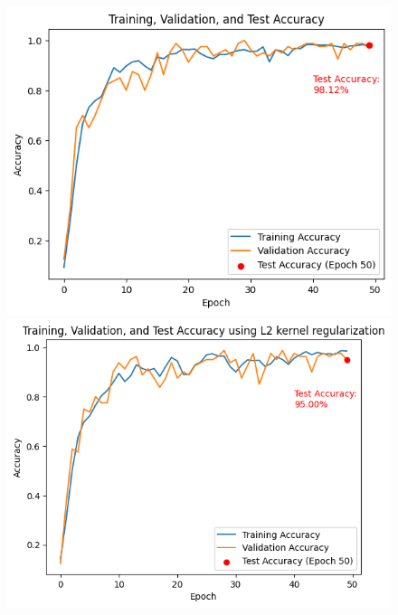 \documentclass{article}
\begin{document}
\begin{figure}[h]
    \centering
    \begin{minipage}{0.32\textwidth}
        \centering
        \includegraphics[width=\textwidth]{images/cnn_accuracy.png}
    \end{minipage}
    \hfill
    \begin{minipage}{0.32\textwidth}
        \centering
        \includegraphics[width=\textwidth]{images/l2_cnn_accuracy.png}
    \end{minipage}
    \hfill
    \begin{minipage}{0.32\textwidth}
        \centering

\end{minipage}
\end{figure}
\end{document}
